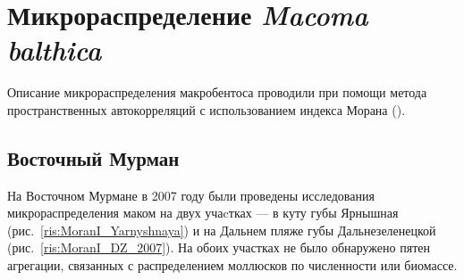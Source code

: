 \section{Микрораспределение {\it Macoma balthica}}	
Описание микрораспределения макробентоса проводили при помощи метода пространственных автокорреляций с использованием индекса Морана (\cite{Thrush_et_al_1989}).

\subsection{Восточный Мурман}
На Восточном Мурмане в 2007 году были проведены исследования микрораспределения маком на двух учаcтках --- в куту губы Ярнышная (рис.~\ref{ris:MoranI_Yarnyshnaya}) и на Дальнем пляже губы Дальнезеленецкой (рис.~\ref{ris:MoranI_DZ_2007}). 
На обоих участках не было обнаружено пятен агрегации, связанных с распределением моллюсков по численности или биомассе.
%
